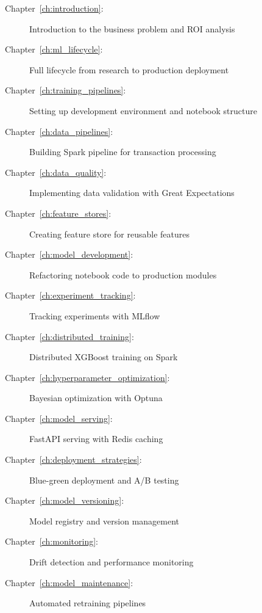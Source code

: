 \begin{description}
    \item[Chapter~\ref{ch:introduction}:] Introduction to the business problem and ROI analysis

    \item[Chapter~\ref{ch:ml_lifecycle}:] Full lifecycle from research to production deployment

    \item[Chapter~\ref{ch:training_pipelines}:] Setting up development environment and notebook structure

    \item[Chapter~\ref{ch:data_pipelines}:] Building Spark pipeline for transaction processing

    \item[Chapter~\ref{ch:data_quality}:] Implementing data validation with Great Expectations

    \item[Chapter~\ref{ch:feature_stores}:] Creating feature store for reusable features

    \item[Chapter~\ref{ch:model_development}:] Refactoring notebook code to production modules

    \item[Chapter~\ref{ch:experiment_tracking}:] Tracking experiments with MLflow

    \item[Chapter~\ref{ch:distributed_training}:] Distributed XGBoost training on Spark

    \item[Chapter~\ref{ch:hyperparameter_optimization}:] Bayesian optimization with Optuna

    \item[Chapter~\ref{ch:model_serving}:] FastAPI serving with Redis caching

    \item[Chapter~\ref{ch:deployment_strategies}:] Blue-green deployment and A/B testing

    \item[Chapter~\ref{ch:model_versioning}:] Model registry and version management

    \item[Chapter~\ref{ch:monitoring}:] Drift detection and performance monitoring

    \item[Chapter~\ref{ch:model_maintenance}:] Automated retraining pipelines


\end{description}

